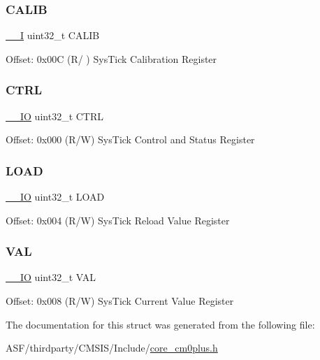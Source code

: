 \subsubsection{\texorpdfstring{CALIB}{CALIB}}
{\footnotesize\ttfamily \mbox{\hyperlink{core__cm0plus_8h_af63697ed9952cc71e1225efe205f6cd3}{\+\_\+\+\_\+I}} uint32\+\_\+t C\+A\+L\+IB}

Offset\+: 0x00C (R/ ) Sys\+Tick Calibration Register \mbox{\label{struct_sys_tick___type_a15fc8d35f045f329b80c544bef35ff64}} 
\subsubsection{\texorpdfstring{CTRL}{CTRL}}
{\footnotesize\ttfamily \mbox{\hyperlink{core__cm0plus_8h_aec43007d9998a0a0e01faede4133d6be}{\+\_\+\+\_\+\+IO}} uint32\+\_\+t C\+T\+RL}

Offset\+: 0x000 (R/W) Sys\+Tick Control and Status Register \mbox{\label{struct_sys_tick___type_aad9adf4efc940cddb8161b69cfbe19d3}} 
\subsubsection{\texorpdfstring{LOAD}{LOAD}}
{\footnotesize\ttfamily \mbox{\hyperlink{core__cm0plus_8h_aec43007d9998a0a0e01faede4133d6be}{\+\_\+\+\_\+\+IO}} uint32\+\_\+t L\+O\+AD}

Offset\+: 0x004 (R/W) Sys\+Tick Reload Value Register \mbox{\label{struct_sys_tick___type_a26fb318c3b0a0ec7f45daafd5f8799a3}} 
\subsubsection{\texorpdfstring{VAL}{VAL}}
{\footnotesize\ttfamily \mbox{\hyperlink{core__cm0plus_8h_aec43007d9998a0a0e01faede4133d6be}{\+\_\+\+\_\+\+IO}} uint32\+\_\+t V\+AL}

Offset\+: 0x008 (R/W) Sys\+Tick Current Value Register 

The documentation for this struct was generated from the following file\+:\begin{DoxyCompactItemize}
\item 
A\+S\+F/thirdparty/\+C\+M\+S\+I\+S/\+Include/\mbox{\hyperlink{core__cm0plus_8h}{core\+\_\+cm0plus.\+h}}\end{DoxyCompactItemize}
